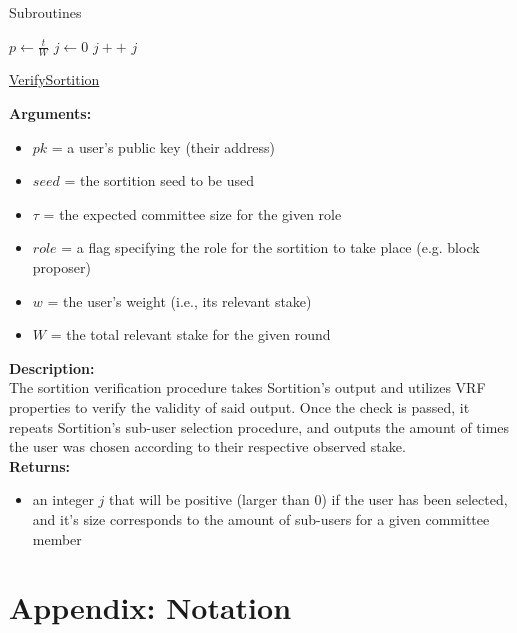 \documentclass[10pt,a4paper]{article}
\begin{document}
\begin{section}{Subroutines}
\begin{algorithm}[H]
    \begin{algorithmic}[1]
        \State $p \gets \frac{t}{W}$
        \State $j \gets 0$
        \While{$\frac{hash}{2^{hashlen}} \notin [\sum_{k=0}^j\mathsf{B}(k;w,p), \sum_{k=0}^{j+1}\mathsf{B}(k;w,p))$}
            \State $j++$
        \EndWhile
        \Return $j$
    \EndFunction
    \end{algorithmic}
    \caption{\underline{VerifySortition}}
\end{algorithm}

\noindent \textbf{Arguments:}
\begin{itemize}
    \item $pk$ = a user's public key (their address)
    \item $seed$ = the sortition seed to be used
    \item $\tau$ = the expected committee size for the given role
    \item $role$ = a flag specifying the role for the sortition to take place (e.g. block proposer)
    \item $w$ = the user's weight (i.e., its relevant stake)
    \item $W$ = the total relevant stake for the given round
  \end{itemize}

\noindent \textbf{Description:}\\
The sortition verification procedure takes Sortition's output and utilizes 
VRF properties to verify the validity of said output.
Once the check is passed, it repeats Sortition's sub-user selection procedure, 
and outputs the amount of times the user was chosen according to their respective 
observed stake.\\

\noindent \textbf{Returns:}
\begin{itemize}
    \item an integer $j$ that will be positive (larger than 0) if the user has been 
    selected, and it's size corresponds to the amount
    of sub-users for a given committee member
  \end{itemize}


\end{section}
\section*{Appendix: Notation}
\end{document}
